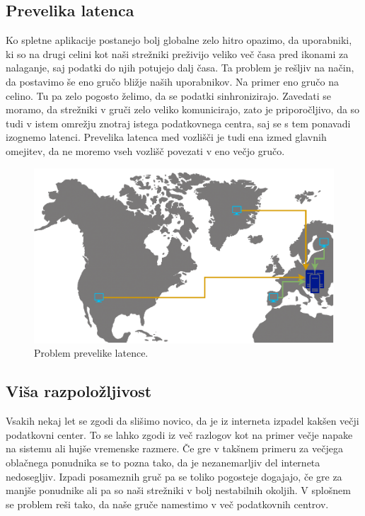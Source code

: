 \documentclass[a4paper, 12pt]{book}
\begin{document}
\subsection{Prevelika latenca}
Ko spletne aplikacije postanejo bolj globalne zelo hitro opazimo, da uporabniki, ki so na drugi celini kot naši strežniki preživijo veliko več časa pred ikonami za nalaganje, saj podatki do njih potujejo dalj časa.
Ta problem je rešljiv na način, da postavimo še eno gručo bližje naših uporabnikov.
Na primer eno gručo na celino.
Tu pa zelo pogosto želimo, da se podatki sinhronizirajo.
Zavedati se moramo, da strežniki v gruči zelo veliko komunicirajo, zato je priporočljivo, da so tudi v istem omrežju znotraj istega podatkovnega centra, saj se s tem ponavadi izognemo latenci. 
Prevelika latenca med vozlišči je tudi ena izmed glavnih omejitev, da ne moremo vseh vozlišč povezati v eno večjo gručo.
\begin{figure}[h]
\begin{center}
  \includegraphics[width=1.0\textwidth]{images/problem-prevelike-latence.pdf}
\end{center}
\caption{Problem prevelike latence.}
\label{problem-prevelike-latence}
\end{figure}
\subsection{Viša razpoložljivost}
Vsakih nekaj let se zgodi da slišimo novico, da je iz interneta izpadel kakšen večji podatkovni center. 
To se lahko zgodi iz več razlogov kot na primer večje napake na sistemu ali hujše vremenske razmere.
Če gre v takšnem primeru za večjega oblačnega ponudnika se to pozna tako, da je nezanemarljiv del interneta nedosegljiv.
Izpadi posameznih gruč pa se toliko pogosteje dogajajo, če gre za manjše ponudnike ali pa so naši strežniki v bolj nestabilnih okoljih. 
V splošnem se problem reši tako, da naše gruče namestimo v več podatkovnih centrov.
\end{document}
